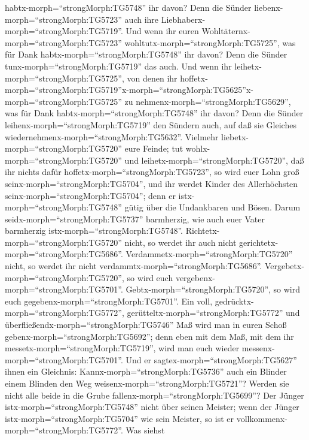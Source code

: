 habtx-morph=``strongMorph:TG5748'' ihr davon? Denn die Sünder
liebenx-morph=``strongMorph:TG5723'' auch ihre
Liebhaberx-morph=``strongMorph:TG5719''.  Und wenn ihr
euren Wohltäternx-morph=``strongMorph:TG5723''
wohltutx-morph=``strongMorph:TG5725'', was für Dank
habtx-morph=``strongMorph:TG5748'' ihr davon? Denn die Sünder
tunx-morph=``strongMorph:TG5719'' das auch.  Und wenn ihr
leihetx-morph=``strongMorph:TG5725'', von denen ihr
hoffetx-morph=``strongMorph:TG5719''\textbar x-morph=``strongMorph:TG5625''x-morph=``strongMorph:TG5725''
zu nehmenx-morph=``strongMorph:TG5629'', was für Dank
habtx-morph=``strongMorph:TG5748'' ihr davon? Denn die Sünder
leihenx-morph=``strongMorph:TG5719'' den Sündern auch, auf daß sie
Gleiches wiedernehmenx-morph=``strongMorph:TG5632''. 
Vielmehr liebetx-morph=``strongMorph:TG5720'' eure Feinde; tut
wohlx-morph=``strongMorph:TG5720'' und
leihetx-morph=``strongMorph:TG5720'', daß ihr nichts dafür
hoffetx-morph=``strongMorph:TG5723'', so wird euer Lohn groß
seinx-morph=``strongMorph:TG5704'', und ihr werdet Kinder des
Allerhöchsten seinx-morph=``strongMorph:TG5704''; denn er
istx-morph=``strongMorph:TG5748'' gütig über die Undankbaren und Bösen.
 Darum seidx-morph=``strongMorph:TG5737'' barmherzig, wie
auch euer Vater barmherzig istx-morph=``strongMorph:TG5748''.
 Richtetx-morph=``strongMorph:TG5720'' nicht, so werdet ihr
auch nicht gerichtetx-morph=``strongMorph:TG5686''.
Verdammetx-morph=``strongMorph:TG5720'' nicht, so werdet ihr nicht
verdammtx-morph=``strongMorph:TG5686''.
Vergebetx-morph=``strongMorph:TG5720'', so wird euch
vergebenx-morph=``strongMorph:TG5701''. 
Gebtx-morph=``strongMorph:TG5720'', so wird euch
gegebenx-morph=``strongMorph:TG5701''. Ein voll,
gedrücktx-morph=``strongMorph:TG5772'',
gerütteltx-morph=``strongMorph:TG5772'' und
überfließendx-morph=``strongMorph:TG5746'' Maß wird man in euren Schoß
gebenx-morph=``strongMorph:TG5692''; denn eben mit dem Maß, mit dem ihr
messetx-morph=``strongMorph:TG5719'', wird man euch wieder
messenx-morph=``strongMorph:TG5701''.  Und er
sagtex-morph=``strongMorph:TG5627'' ihnen ein Gleichnis:
Kannx-morph=``strongMorph:TG5736'' auch ein Blinder einem Blinden den
Weg weisenx-morph=``strongMorph:TG5721''? Werden sie nicht alle beide in
die Grube fallenx-morph=``strongMorph:TG5699''?  Der Jünger
istx-morph=``strongMorph:TG5748'' nicht über seinen Meister; wenn der
Jünger istx-morph=``strongMorph:TG5704'' wie sein Meister, so ist er
vollkommenx-morph=``strongMorph:TG5772''.  Was siehst
